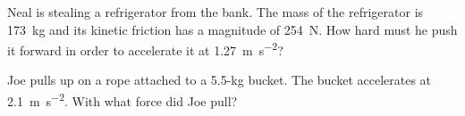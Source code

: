 \documentclass[10pt]{exam}
\begin{document}
\begin{questions}
\begin{multicols}{2}
    
  \end{multicols}
  
\question
  Neal is stealing a refrigerator from the bank.  The mass of the refrigerator is \SI{173}{\kilo\gram} and its kinetic friction has a magnitude of \SI{254}{\newton}.  How hard must he push it forward in order to accelerate it at \SI{1.27}{\meter\per\second^2}?

  \vs

\question 
  Joe pulls up on a rope attached to a 5.5-kg bucket.  The bucket accelerates at \SI{2.1}{\meter\per\second^2}.  With what force did Joe pull?

  \vspace{1em}

  \vs


\end{questions}
\end{document}
